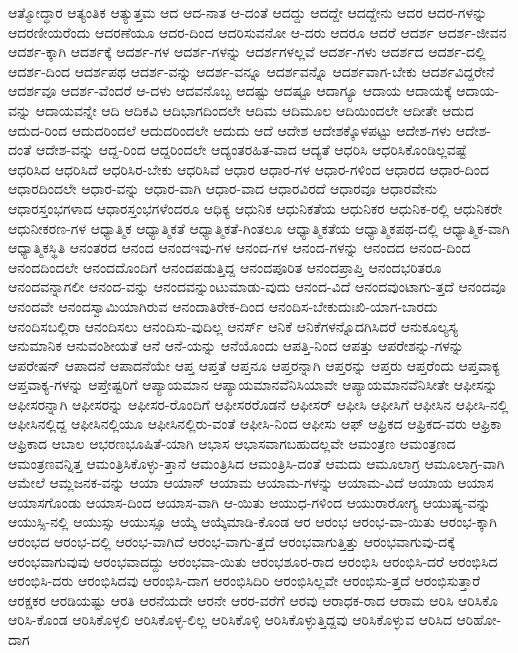 {ಆತ್ಮೋದ್ಧಾರ
ಆತ್ಯಂತಿಕ
ಆತ್ಯುತ್ತಮ
ಆದ
ಆದ-ನಾತ
ಆ-ದಂತೆ
ಆದದ್ದು
ಆದದ್ದೇ
ಆದದ್ದೇನು
ಆದರ
ಆದರ-ಗಳನ್ನು
ಆದರಣೀಯರೆಂದು
ಆದರಣೆಯೂ
ಆದರ-ದಿಂದ
ಆದರಿಸುವನೋ
ಆ-ದರು
ಆದರೂ
ಆದರೆ
ಆದರ್ಶ
ಆದರ್ಶ-ಜೀವನ
ಆದರ್ಶ-ಕ್ಕಾಗಿ
ಆದರ್ಶಕ್ಕೆ
ಆದರ್ಶ-ಗಳ
ಆದರ್ಶ-ಗಳನ್ನು
ಆದರ್ಶಗಳಲ್ಲವೆ
ಆದರ್ಶ-ಗಳು
ಆದರ್ಶದ
ಆದರ್ಶ-ದಲ್ಲಿ
ಆದರ್ಶ-ದಿಂದ
ಆದರ್ಶಪಥ
ಆದರ್ಶ-ವನ್ನು
ಆದರ್ಶ-ವನ್ನೂ
ಆದರ್ಶವನ್ನೊ
ಆದರ್ಶವಾಗ-ಬೇಕು
ಆದರ್ಶವಿದ್ದರೇನೆ
ಆದರ್ಶವೂ
ಆದರ್ಶ-ವೆಂದರೆ
ಆ-ದಳು
ಆದವನೊಬ್ಬ
ಆದಷ್ಟು
ಆದಷ್ಟೂ
ಆದಾಗ್ಯೂ
ಆದಾಯ
ಆದಾಯಕ್ಕೆ
ಆದಾಯ-ವನ್ನು
ಆದಾಯವನ್ನೇ
ಆದಿ
ಆದಿಕವಿ
ಆದಿಭಾಗದಿಂದಲೇ
ಆದಿಮ
ಆದಿಮೂಲ
ಆದಿಯಿಂದಲೇ
ಆದೀತೇ
ಆದುದ
ಆದುದ-ರಿಂದ
ಆದುದರಿಂದಲೆ
ಆದುದರಿಂದಲೇ
ಆದುದು
ಆದೆ
ಆದೇಶ
ಆದೇಶಕ್ಕೊಳಪಟ್ಟು
ಆದೇಶ-ಗಳು
ಆದೇಶ-ದಂತೆ
ಆದೇಶ-ವನ್ನು
ಆದ್ದ-ರಿಂದ
ಆದ್ದರಿಂದಲೇ
ಆದ್ಯಂತರಹಿತ-ವಾದ
ಆದ್ಯತೆ
ಆಧರಿಸಿ
ಆಧರಿಸಿಕೊಂಡಿಲ್ಲವಷ್ಟೆ
ಆಧರಿಸಿದ
ಆಧರಿಸಿದೆ
ಆಧರಿಸಿರ-ಬೇಕು
ಆಧರಿಸಿವೆ
ಆಧಾರ
ಆಧಾರ-ಗಳ
ಆಧಾರ-ಗಳಿಂದ
ಆಧಾರದ
ಆಧಾರ-ದಿಂದ
ಆಧಾರದಿಂದಲೇ
ಆಧಾರ-ವನ್ನು
ಆಧಾರ-ವಾಗಿ
ಆಧಾರ-ವಾದ
ಆಧಾರವಿರದೆ
ಆಧಾರವೂ
ಆಧಾರವೇನು
ಆಧಾರಸ್ತಂಭಗಳಾದ
ಆಧಾರಸ್ತಂಭಗಳೆಂದರೂ
ಆಧಿಕ್ಯ
ಆಧುನಿಕ
ಆಧುನಿಕತೆಯ
ಆಧುನಿಕರ
ಆಧುನಿಕ-ರಲ್ಲಿ
ಆಧುನಿಕರೇ
ಆಧುನೀಕರಣ-ಗಳ
ಆಧ್ಯಾತ್ಮಿಕ
ಆಧ್ಯಾತ್ಮಿಕತೆ
ಆಧ್ಯಾತ್ಮಿಕತೆ-ಗಿಂತಲೂ
ಆಧ್ಯಾತ್ಮಿಕತೆಯ
ಆಧ್ಯಾತ್ಮಿಕಪಥ-ದಲ್ಲಿ
ಆಧ್ಯಾತ್ಮಿಕ-ವಾಗಿ
ಆಧ್ಯಾತ್ಮಿಕಸ್ಥಿತಿ
ಆನಂತರದ
ಆನಂದ
ಆನಂದಇವು-ಗಳ
ಆನಂದ-ಗಳ
ಆನಂದ-ಗಳನ್ನು
ಆನಂದದ
ಆನಂದ-ದಿಂದ
ಆನಂದದಿಂದಲೇ
ಆನಂದದೊಂದಿಗೆ
ಆನಂದಪಡುತ್ತಿದ್ದ
ಆನಂದಪೂರಿತ
ಆನಂದಪ್ರಾಪ್ತಿ
ಆನಂದಭರಿತರೂ
ಆನಂದವನ್ನಾಗಲೀ
ಆನಂದ-ವನ್ನು
ಆನಂದವನ್ನುಂಟುಮಾಡು-ವುದು
ಆನಂದ-ವಿದೆ
ಆನಂದವುಂಟಾಗು-ತ್ತದೆ
ಆನಂದವೂ
ಆನಂದವೇ
ಆನಂದಸ್ವಾಮಿಯಾಗಿರುವ
ಆನಂದಾತಿರೇಕ-ದಿಂದ
ಆನಂದಿಸ-ಬೇಕುದುಃಖಿ-ಯಾಗ-ಬಾರದು
ಆನಂದಿಸಬಲ್ಲಿರಾ
ಆನಂದಿಸಲು
ಆನಂದಿಸು-ವುದಿಲ್ಲ
ಆನರ್ಸ್
ಆನಿಕೆ
ಆನಿಕೆಗಳನ್ನೊದಗಿಸಿದರೆ
ಆನುಕೂಲ್ಯಸ್ಯ
ಆನುಮಾನಿಕ
ಆನುವಂಶೀಯತೆ
ಆನೆ
ಆನೆ-ಯನ್ನು
ಆನೆಯೊಂದು
ಆಪತ್ತಿ-ನಿಂದ
ಆಪತ್ತು
ಆಪರೇಶನ್ನು-ಗಳನ್ನು
ಆಪರೇಷನ್
ಆಪಾದನೆ
ಆಪಾದನೆಯೇ
ಆಪ್ತ
ಆಪ್ತತೆ
ಆಪ್ತನೂ
ಆಪ್ತರನ್ನಾಗಿ
ಆಪ್ತರನ್ನು
ಆಪ್ತರು
ಆಪ್ತರೆಂದು
ಆಪ್ತವಾಕ್ಯ
ಆಪ್ತವಾಕ್ಯ-ಗಳನ್ನು
ಆಪ್ತೇಷ್ಟರಿಗೆ
ಆಪ್ಯಾಯಮಾನ
ಆಪ್ಯಾಯಮಾನವೆನಿಸಿಯಾವೇ
ಆಪ್ಯಾಯಮಾನವೆನಿಸೀತೇ
ಆಫೀಸನ್ನು
ಆಫೀಸರನ್ನಾಗಿ
ಆಫೀಸರನ್ನು
ಆಫೀಸರ-ರೊಂದಿಗೆ
ಆಫೀಸರರೊಡನೆ
ಆಫೀಸರ್
ಆಫೀಸಿ
ಆಫೀಸಿಗೆ
ಆಫೀಸಿನ
ಆಫೀಸಿ-ನಲ್ಲಿ
ಆಫೀಸಿನಲ್ಲಿದ್ದ
ಆಫೀಸಿನಲ್ಲಿಯೂ
ಆಫೀಸಿನಲ್ಲಿರು-ವಂತೆ
ಆಫೀಸಿ-ನಿಂದ
ಆಫೀಸು
ಆಫ್
ಆಫ್ರಿಕದ
ಆಫ್ರಿಕದ-ವರು
ಆಫ್ರಿಕಾ
ಆಫ್ರಿಕಾದ
ಆಬಾಲ
ಆಭರಣಭೂಷಿತೆ-ಯಾಗಿ
ಆಭಾಸ
ಆಭಾಸವಾಗಬಹುದಲ್ಲವೇ
ಆಮಂತ್ರಣ
ಆಮಂತ್ರಣದ
ಆಮಂತ್ರಣವನ್ನಿತ್ತ
ಆಮಂತ್ರಿಸಿಕೊಳ್ಳು-ತ್ತಾನೆ
ಆಮಂತ್ರಿಸಿದ
ಆಮಂತ್ರಿಸಿ-ದಂತೆ
ಆಮದು
ಆಮೂಲಾಗ್ರ
ಆಮೂಲಾಗ್ರ-ವಾಗಿ
ಆಮೇಲೆ
ಆಮ್ಲಜನಕ-ವನ್ನು
ಆಯಾ
ಆಯಾನ್
ಆಯಾಮ
ಆಯಾಮ-ಗಳನ್ನು
ಆಯಾಮ-ವಿದೆ
ಆಯಾಯ
ಆಯಾಸ
ಆಯಾಸಗೊಂಡು
ಆಯಾಸ-ದಿಂದ
ಆಯಾಸ-ವಾಗಿ
ಆ-ಯಿತು
ಆಯುಧ-ಗಳಿಂದ
ಆಯುರಾರೋಗ್ಯ
ಆಯುಷ್ಯ-ವನ್ನು
ಆಯುಸ್ಸಿ-ನಲ್ಲಿ
ಆಯುಸ್ಸು
ಆಯುಸ್ಸೂ
ಆಯ್ಕೆ
ಆಯ್ಕೆಮಾಡಿ-ಕೊಂಡ
ಆರ
ಆರಂಭ
ಆರಂಭ-ವಾ-ಯಿತು
ಆರಂಭ-ಕ್ಕಾಗಿ
ಆರಂಭದ
ಆರಂಭ-ದಲ್ಲಿ
ಆರಂಭ-ವಾಗಿದೆ
ಆರಂಭ-ವಾಗು-ತ್ತದೆ
ಆರಂಭವಾಗುತ್ತಿತ್ತು
ಆರಂಭವಾಗುವು-ದಕ್ಕೆ
ಆರಂಭವಾಗುವುವು
ಆರಂಭವಾದದ್ದು
ಆರಂಭವಾ-ಯಿತು
ಆರಂಭಶೂರ-ರಾದ
ಆರಂಭಿಸಿ
ಆರಂಭಿಸಿ-ದರೆ
ಆರಂಭಿಸಿದ
ಆರಂಭಿಸಿ-ದರು
ಆರಂಭಿಸಿದವು
ಆರಂಭಿಸಿ-ದಾಗ
ಆರಂಭಿಸಿದಿರಿ
ಆರಂಭಿಸಿಲ್ಲವೇ
ಆರಂಭಿಸು-ತ್ತದೆ
ಆರಂಭಿಸುತ್ತಾರೆ
ಆರಕ್ಷಕರ
ಆರಡಿಯಷ್ಟು
ಆರತಿ
ಆರನೆಯದೇ
ಆರನೇ
ಆರರ-ವರೆಗೆ
ಆರವು
ಆರಾಧಕ-ರಾದ
ಆರಾಮ
ಆರಿಸಿ
ಆರಿಸಿಕೊ
ಆರಿಸಿ-ಕೊಂಡ
ಆರಿಸಿಕೊಳ್ಳಲಿ
ಆರಿಸಿಕೊಳ್ಳ-ಲಿಲ್ಲ
ಆರಿಸಿಕೊಳ್ಳಿ
ಆರಿಸಿಕೊಳ್ಳುತ್ತಿದ್ದವು
ಆರಿಸಿಕೊಳ್ಳುವ
ಆರಿಸಿದ
ಆರಿಹೋ-ದಾಗ
}

